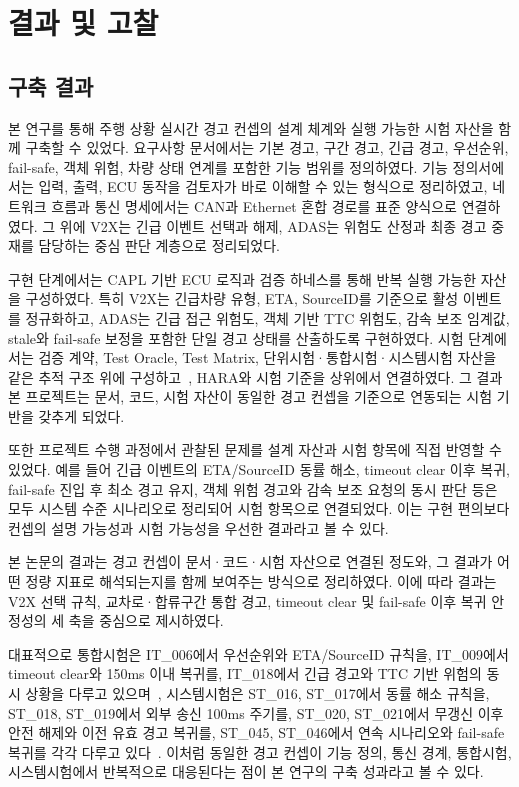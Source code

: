 \documentclass[10pt,a4paper,twocolumn]{article}
\begin{document}
\section{결과 및 고찰}

\subsection{구축 결과}

본 연구를 통해 주행 상황 실시간 경고 컨셉의 설계 체계와 실행 가능한 시험 자산을 함께 구축할 수 있었다. 요구사항 문서에서는 기본 경고, 구간 경고, 긴급 경고, 우선순위, fail-safe, 객체 위험, 차량 상태 연계를 포함한 기능 범위를 정의하였다. 기능 정의서에서는 입력, 출력, ECU 동작을 검토자가 바로 이해할 수 있는 형식으로 정리하였고, 네트워크 흐름과 통신 명세에서는 CAN과 Ethernet 혼합 경로를 표준 양식으로 연결하였다. 그 위에 V2X는 긴급 이벤트 선택과 해제, ADAS는 위험도 산정과 최종 경고 중재를 담당하는 중심 판단 계층으로 정리되었다.

구현 단계에서는 CAPL 기반 ECU 로직과 검증 하네스를 통해 반복 실행 가능한 자산을 구성하였다. 특히 V2X는 긴급차량 유형, ETA, SourceID를 기준으로 활성 이벤트를 정규화하고, ADAS는 긴급 접근 위험도, 객체 기반 TTC 위험도, 감속 보조 임계값, stale와 fail-safe 보정을 포함한 단일 경고 상태를 산출하도록 구현하였다. 시험 단계에서는 검증 계약, Test Oracle, Test Matrix, 단위시험·통합시험·시스템시험 자산을 같은 추적 구조 위에 구성하고~\cite{suite_policy}, HARA와 시험 기준을 상위에서 연결하였다. 그 결과 본 프로젝트는 문서, 코드, 시험 자산이 동일한 경고 컨셉을 기준으로 연동되는 시험 기반을 갖추게 되었다.

또한 프로젝트 수행 과정에서 관찰된 문제를 설계 자산과 시험 항목에 직접 반영할 수 있었다. 예를 들어 긴급 이벤트의 ETA/SourceID 동률 해소, timeout clear 이후 복귀, fail-safe 진입 후 최소 경고 유지, 객체 위험 경고와 감속 보조 요청의 동시 판단 등은 모두 시스템 수준 시나리오로 정리되어 시험 항목으로 연결되었다. 이는 구현 편의보다 컨셉의 설명 가능성과 시험 가능성을 우선한 결과라고 볼 수 있다.

본 논문의 결과는 경고 컨셉이 문서·코드·시험 자산으로 연결된 정도와, 그 결과가 어떤 정량 지표로 해석되는지를 함께 보여주는 방식으로 정리하였다. 이에 따라 결과는 V2X 선택 규칙, 교차로·합류구간 통합 경고, timeout clear 및 fail-safe 이후 복귀 안정성의 세 축을 중심으로 제시하였다.

대표적으로 통합시험은 IT\_006에서 우선순위와 ETA/SourceID 규칙을, IT\_009에서 timeout clear와 150ms 이내 복귀를, IT\_018에서 긴급 경고와 TTC 기반 위험의 동시 상황을 다루고 있으며~\cite{integration_test}, 시스템시험은 ST\_016, ST\_017에서 동률 해소 규칙을, ST\_018, ST\_019에서 외부 송신 100ms 주기를, ST\_020, ST\_021에서 무갱신 이후 안전 해제와 이전 유효 경고 복귀를, ST\_045, ST\_046에서 연속 시나리오와 fail-safe 복귀를 각각 다루고 있다~\cite{system_test}. 이처럼 동일한 경고 컨셉이 기능 정의, 통신 경계, 통합시험, 시스템시험에서 반복적으로 대응된다는 점이 본 연구의 구축 성과라고 볼 수 있다.
\end{document}
